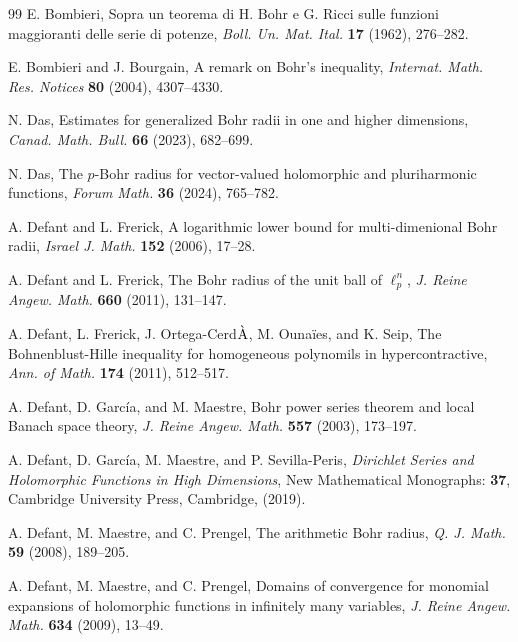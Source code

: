 \documentclass[a4paper,12pt]{amsart}
\theoremstyle{definition}
\begin{document}
\begin{thebibliography}{99}
	 {\sc E. Bombieri}, Sopra un teorema di H. Bohr e G. Ricci sulle funzioni maggioranti delle serie di potenze, {\it Boll. Un. Mat. Ital.} {\bf 17} (1962), 276--282.
	
	 {\sc E. Bombieri} and {\sc J. Bourgain}, A remark on Bohr's inequality, {\it Internat. Math. Res. Notices} {\bf 80} (2004), 4307--4330.
	

	
	 {\sc N. Das}, Estimates for generalized Bohr radii in one and higher dimensions, {\it Canad. Math. Bull.} {\bf 66} (2023), 682--699.
	
	 {\sc N. Das}, The $p$-Bohr radius for vector-valued holomorphic and pluriharmonic functions, {\it Forum Math.} {\bf 36} (2024), 765--782.
	
	 {\sc A. Defant} and {\sc L. Frerick}, A logarithmic lower bound for multi-dimenional Bohr radii, {\it Israel J. Math.} {\bf 152} (2006), 17--28.
	
    {\sc A. Defant} and {\sc L. Frerick}, The Bohr radius of the unit ball of $\ell^n_p$, {\it J. Reine Angew. Math.} {\bf 660} (2011), 131--147.
	
	 {\sc A. Defant, L. Frerick, J. Ortega-Cerd${\rm \grave{A}}$, M. Ouna{\"i}es}, and {\sc K. Seip}, The Bohnenblust-Hille inequality for homogeneous polynomils in hypercontractive, {\it Ann. of Math.} {\bf 174} (2011), 512--517.
	
	 {\sc A. Defant, D. Garc\'{i}a}, and {\sc  M. Maestre}, Bohr power series theorem and local Banach space theory, {\it J. Reine Angew. Math.} {\bf 557} (2003), 173--197.
	
	
	 {\sc A. Defant, D. García,  M. Maestre}, and {\sc P. Sevilla-Peris}, \textit{Dirichlet Series and Holomorphic Functions in High Dimensions}, New Mathematical Monographs: {\bf 37}, Cambridge University Press, Cambridge, (2019).
	
	 {\sc A. Defant,  M. Maestre}, and {\sc  C. Prengel}, The arithmetic Bohr radius, {\it Q. J. Math.} {\bf 59} (2008), 189--205.
	
	 {\sc A. Defant,  M. Maestre}, and {\sc  C. Prengel}, Domains of convergence for monomial expansions of holomorphic functions in infinitely many variables, {\it J. Reine Angew. Math.} {\bf 634} (2009), 13--49.
	

\end{thebibliography}
\end{document}
